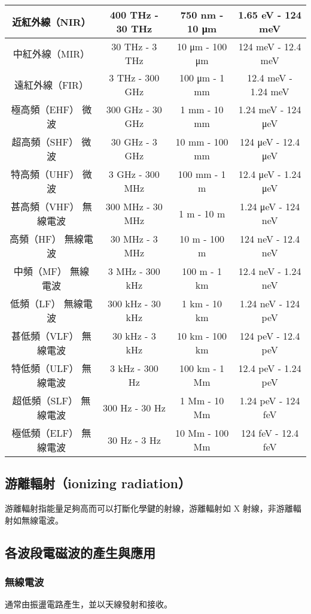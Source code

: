 \documentclass[a4paper,12pt]{report}
\begin{document}
\begin{itemize}
\begin{table}[H]
\begin{tabular}{|c|c|c|c|}
\hline
近紅外線（NIR） & 400 THz - 30 THz & 750 nm - 10 μm & 1.65 eV - 124 meV \\
\hline
中紅外線（MIR） & 30 THz - 3 THz & 10 μm - 100 μm & 124 meV - 12.4 meV \\
\hline
遠紅外線（FIR） & 3 THz - 300 GHz & 100 μm - 1 mm & 12.4 meV - 1.24 meV \\
\hline
極高頻（EHF） 微波 & 300 GHz - 30 GHz & 1 mm - 10 mm & 1.24 meV - 124 μeV \\
\hline
超高頻（SHF） 微波 & 30 GHz - 3 GHz & 10 mm - 100 mm & 124 μeV - 12.4 μeV \\
\hline
特高頻（UHF） 微波 & 3 GHz - 300 MHz & 100 mm - 1 m & 12.4 μeV - 1.24 μeV \\
\hline
甚高頻（VHF） 無線電波 & 300 MHz - 30 MHz & 1 m - 10 m & 1.24 μeV - 124 neV \\
\hline
高頻（HF） 無線電波 & 30 MHz - 3 MHz & 10 m - 100 m & 124 neV - 12.4 neV \\
\hline
中頻（MF） 無線電波 & 3 MHz - 300 kHz & 100 m - 1 km & 12.4 neV - 1.24 neV \\
\hline
低頻（LF） 無線電波 & 300 kHz - 30 kHz & 1 km - 10 km & 1.24 neV - 124 peV \\
\hline
甚低頻（VLF） 無線電波 & 30 kHz - 3 kHz & 10 km - 100 km & 124 peV - 12.4 peV \\
\hline
特低頻（ULF） 無線電波 & 3 kHz - 300 Hz & 100 km - 1 Mm & 12.4 peV - 1.24 peV \\
\hline
超低頻（SLF） 無線電波 & 300 Hz - 30 Hz & 1 Mm - 10 Mm & 1.24 peV - 124 feV \\
\hline
極低頻（ELF） 無線電波 & 30 Hz - 3 Hz & 10 Mm - 100 Mm & 124 feV - 12.4 feV \\
\hline
\end{tabular}
\end{table}\FB\ect
\subsection{游離輻射（ionizing radiation）}
游離輻射指能量足夠高而可以打斷化學鍵的射線，游離輻射如 X 射線，非游離輻射如無線電波。
\subsection{各波段電磁波的產生與應用}
\subsubsection{無線電波}
通常由振盪電路產生，並以天線發射和接收。


\end{itemize}
\end{document}
